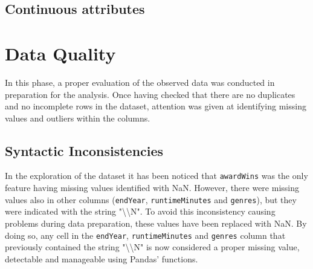 \subsection{Continuous attributes}


\section{Data Quality}\label{sec:data_quality}
In this phase, a proper evaluation of the observed data was conducted in preparation for the analysis.
Once having checked that there are no duplicates and no incomplete rows in the dataset, attention was given at identifying missing values and outliers within the columns.

\subsection{Syntactic Inconsistencies}
In the exploration of the dataset it has been noticed that \texttt{awardWins} was the only feature having missing values identified with NaN.
However, there were missing values also in other columns (\texttt{endYear}, \texttt{runtimeMinutes} and \texttt{genres}), but they were indicated with the string "\textbackslash\textbackslash N".
To avoid this inconsistency causing problems during data preparation, these values have been replaced with NaN.
By doing so, any cell in the \texttt{endYear}, \texttt{runtimeMinutes} and \texttt{genres} column that previously contained the string "\textbackslash\textbackslash N" is now considered a proper missing value, detectable and manageable using Pandas' functions.

